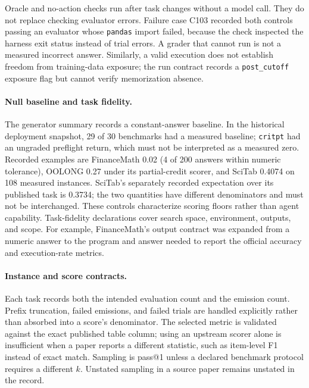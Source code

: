 Oracle and no-action checks run after task changes without a model call. They do not replace
checking evaluator errors. Failure case C103 recorded both controls passing an evaluator whose
\texttt{pandas} import failed, because the check inspected the harness exit status instead of
trial errors. A grader that cannot run is not a measured incorrect answer. Similarly, a valid
execution does not establish freedom from training-data exposure; the run contract records a
\texttt{post\_cutoff} exposure flag but cannot verify memorization absence.

\paragraph{Null baseline and task fidelity.}
The generator summary records a constant-answer baseline. In the historical deployment snapshot,
29 of 30 benchmarks had a measured baseline; \texttt{critpt} had an ungraded preflight return,
which must not be interpreted as a measured zero. Recorded examples are FinanceMath 0.02
(4 of 200 answers within numeric tolerance), OOLONG 0.27 under its partial-credit scorer, and
SciTab 0.4074 on 108 measured instances. SciTab's separately recorded expectation over its
published task is 0.3734; the two quantities have different denominators and must not be
interchanged. These controls characterize scoring floors rather than agent capability.
Task-fidelity declarations cover search space, environment, outputs, and scope. For example,
FinanceMath's output contract was expanded from a numeric answer to the program and answer
needed to report the official accuracy and execution-rate metrics.

\paragraph{Instance and score contracts.}
Each task records both the intended evaluation count and the emission count. Prefix truncation,
failed emissions, and failed trials are handled explicitly rather than absorbed into a score's
denominator. The selected metric is validated against the exact published table column; using
an upstream scorer alone is insufficient when a paper reports a different statistic, such as
item-level F1 instead of exact match. Sampling is pass@1 unless a declared benchmark protocol
requires a different $k$. Unstated sampling in a source paper remains unstated in the record.

